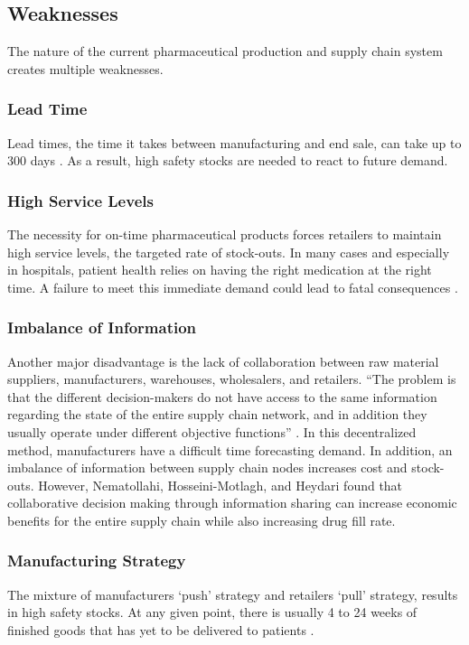 \documentclass[sigconf]{acmart}
\begin{document}
\subsection{Weaknesses}
The nature of the current pharmaceutical production and supply chain system creates multiple weaknesses. 
\subsubsection{Lead Time} Lead times, the time it takes between manufacturing and end sale, can take up to 300 days \cite{Shah01}. As a result, high safety stocks are needed to react to future demand.
\subsubsection{High Service Levels} The necessity for on-time pharmaceutical products forces retailers to maintain high service levels, the targeted rate of stock-outs. In many cases and especially in hospitals, patient health relies on having the right medication at the right time. A failure to meet this immediate demand could lead to fatal consequences \cite{Kelle01} \cite{Hua01}.
\subsubsection{Imbalance of Information} Another major disadvantage is the lack of collaboration between raw material suppliers, manufacturers, warehouses, wholesalers, and retailers. ``The problem is that the different decision-makers do not have access to the same information regarding the state of the entire supply chain network, and in addition they usually operate under different objective functions'' \cite{Sahay01}. In this decentralized method, manufacturers have a difficult time forecasting demand. In addition, an imbalance of information between supply chain nodes increases cost and stock-outs. However, Nematollahi, Hosseini-Motlagh, and Heydari \cite{Nematollahi01} found that collaborative decision making through information sharing can increase economic benefits for the entire supply chain while also increasing drug fill rate.
\subsubsection{Manufacturing Strategy} The mixture of manufacturers `push' strategy and retailers `pull' strategy, results in high safety stocks. At any given point, there is usually 4 to 24 weeks of finished goods that has yet to be delivered to patients \cite{Shah01}. 
\end{document}

